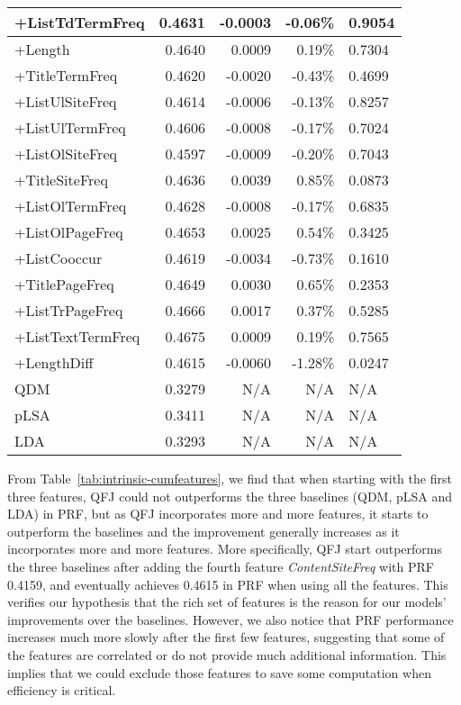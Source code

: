 \begin{table}[!ht]
\begin{tabular}{|l|r|r|r|l|}
+ListTdTermFreq & 0.4631 & -0.0003 & -0.06\% & 0.9054 \\ \hline
+Length & 0.4640 & 0.0009 & 0.19\% & 0.7304 \\ \hline
+TitleTermFreq & 0.4620 & -0.0020 & -0.43\% & 0.4699 \\ \hline
+ListUlSiteFreq & 0.4614 & -0.0006 & -0.13\% & 0.8257 \\ \hline
+ListUlTermFreq & 0.4606 & -0.0008 & -0.17\% & 0.7024 \\ \hline
+ListOlSiteFreq & 0.4597 & -0.0009 & -0.20\% & 0.7043 \\ \hline
+TitleSiteFreq & 0.4636 & 0.0039 & 0.85\% & 0.0873 \\ \hline
+ListOlTermFreq & 0.4628 & -0.0008 & -0.17\% & 0.6835 \\ \hline
+ListOlPageFreq & 0.4653 & 0.0025 & 0.54\% & 0.3425 \\ \hline
+ListCooccur & 0.4619 & -0.0034 & -0.73\% & 0.1610 \\ \hline
+TitlePageFreq & 0.4649 & 0.0030 & 0.65\% & 0.2353 \\ \hline
+ListTrPageFreq & 0.4666 & 0.0017 & 0.37\% & 0.5285 \\ \hline
+ListTextTermFreq & 0.4675 & 0.0009 & 0.19\% & 0.7565 \\ \hline
+LengthDiff & 0.4615 & -0.0060 & -1.28\% & 0.0247 \\ \hhline{=====}
QDM & 0.3279 & N/A & N/A & N/A \\ \hline
pLSA & 0.3411 & N/A & N/A & N/A \\ \hline
LDA & 0.3293 & N/A & N/A & N/A \\ \hline
\end{tabular}
\end{table}

From Table~\ref{tab:intrinsic-cumfeatures}, we find that when starting with the first three features, QFJ could not outperforms the three baselines (QDM, pLSA and LDA) in PRF, but as QFJ incorporates more and more features, it starts to outperform the baselines and the improvement generally increases as it incorporates more and more features. More specifically, QFJ start outperforms the three baselines after adding the fourth feature \textit{ContentSiteFreq} with PRF 0.4159, and eventually achieves 0.4615 in PRF when using all the features. This verifies our hypothesis that the rich set of features is the reason for our models' improvements over the baselines. However, we also notice that PRF performance increases much more slowly after the first few features, suggesting that some of the features are correlated or do not provide much additional information. This implies that we could exclude those features to save some computation when efficiency is critical.



